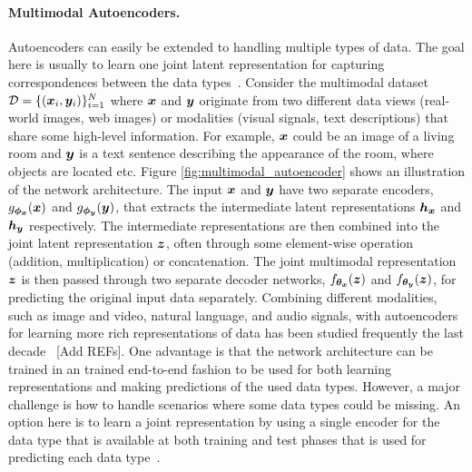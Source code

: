 \paragraph{Multimodal Autoencoders.} Autoencoders can easily be extended to handling multiple types of data. The goal here is usually to learn one joint latent representation for capturing correspondences between the data types~\cite{baltruvsaitis2018multimodal}. Consider the multimodal dataset ${\mathcal{D}} = \{({\bm{x}}_i, {\bm{y}}_i)\}_{i=1}^{N}$ where ${\bm{x}}$ and ${\bm{y}}$ originate from two different data views (real-world images, web images) or modalities (visual signals, text descriptions) that share some high-level information. For example, ${\bm{x}}$ could be an image of a living room and ${\bm{y}}$ is a text sentence describing the appearance of the room, where objects are located etc. 
Figure \ref{fig:multimodal_autoencoder} shows an illustration of the network architecture. The input ${\bm{x}}$ and ${\bm{y}}$ have two separate encoders, $g_{{\bm{\phi}}_{{\bm{x}}}}({\bm{x}})$ and $g_{{\bm{\phi}}_{{\bm{y}}}}({\bm{y}})$, that extracts the intermediate latent representations ${\bm{h}}_{{\bm{x}}}$ and ${\bm{h}}_{{\bm{y}}}$ respectively. The intermediate representations are then combined into the joint latent representation ${\bm{z}}$, often through some element-wise operation (addition, multiplication) or concatenation. The joint multimodal representation ${\bm{z}}$ is then passed through two separate decoder networks, $f_{{\bm{\theta}}_{{\bm{x}}}}({\bm{z}})$ and $f_{{\bm{\theta}}_{{\bm{y}}}}({\bm{z}})$, for predicting the original input data separately. 
Combining different modalities, such as image and video, natural language, and audio signals, with autoencoders for learning more rich representations of data has been studied frequently the last decade~\cite{owens2018audio, ngiam2011multimodal, silberer2014learning, lee2020making} [Add REFs]. One advantage is that the network architecture can be trained in an trained end-to-end fashion to be used for both learning representations and making predictions of the used data types.
However, a major challenge is how to handle scenarios where some data types could be missing. An option here is to learn a joint representation by using a single encoder for the data type that is available at both training and test phases that is used for predicting each data type~\cite{ngiam2011multimodal}. 



